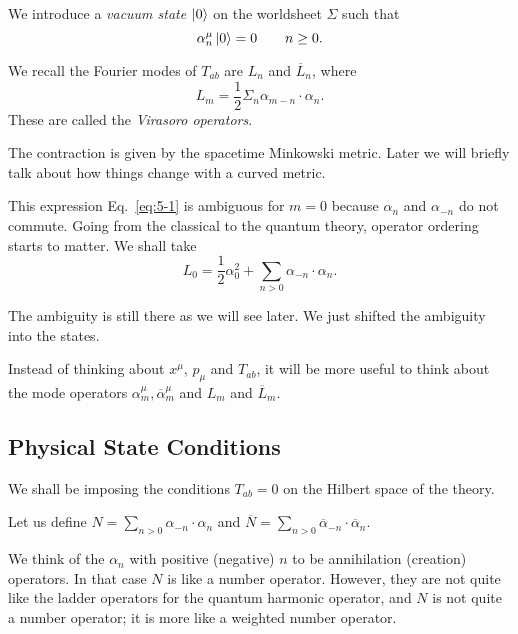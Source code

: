 \begin{definition}[vacuum]
  We introduce a \emph{vacuum state} $\ket{0}$ on the worldsheet $\Sigma$ such that
  \begin{equation}
    \alpha_n^{\mu} \ket{0} = 0 \qquad n \geq 0.
  \end{equation}
\end{definition}

We recall the Fourier modes of $T_{ab}$  are $L_n$  and $\overline{L}_n$, where
\begin{equation}
  \label{eq:5-1}
  L_m = \frac{1}{2} \Sigma_n \alpha_{m - n} \cdot \alpha_n.
\end{equation}
These are called the \emph{Virasoro operators}.
\begin{leftbar}
  The contraction is given by the spacetime Minkowski metric.
  Later we will briefly talk about how things change with a curved metric.
\end{leftbar}
This expression Eq.~\eqref{eq:5-1} is ambiguous for $m = 0$ because $\alpha_n$ and $\alpha_{-n}$ do not commute. Going from the classical to the quantum theory, operator ordering starts to matter. 
We shall take
\begin{equation}
  \label{eq:5-2}
  L_0 = \frac{1}{2} \alpha_0^2 + \sum_{n > 0} \alpha_{-n} \cdot \alpha_n.
\end{equation}
\begin{leftbar}
  The ambiguity is still there as we will see later. We just shifted the ambiguity into the states.
\end{leftbar}

Instead of thinking about $x^{\mu}$, $p_{\mu}$ and $T_{ab}$, it will be more useful to think about the mode operators $\alpha^{\mu}_m, \overline{\alpha}^{\mu}_m$ and $L_m$ and $\overline{L}_m$.

\subsection{Physical State Conditions}%
\label{sub:physical_state_conditions}

We shall be imposing the conditions $T_{ab} = 0$  on the Hilbert space of the theory.

\begin{notation}[]
  Let us define $N = \sum_{n > 0} \alpha_{-n} \cdot \alpha_n$ and $\overline{N} = \sum_{n > 0} \overline{\alpha}_{-n} \cdot \overline{\alpha}_n$.
\end{notation}
\begin{leftbar}
  We think of the $\alpha_n$ with positive (negative) $n$ to be annihilation (creation) operators.
  In that case $N$ is like a number operator.
  However, they are not quite like the ladder operators for the quantum harmonic operator, and $N$ is not quite a number operator; it is more like a weighted number operator.
\end{leftbar}

